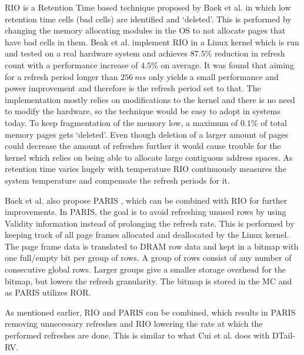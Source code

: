 RIO is a Retention Time based technique proposed by Baek et al. \cite{rioparis} in which low retention time cells (bad cells) are identified and `deleted'. This is performed by changing the memory allocating modules in the OS to not allocate pages that have bad cells in them. Beak et al. implement RIO in a Linux kernel which is run and tested on a real hardware system and achieves $87.5\%$ reduction in refresh count with a performance increase of $4.5\%$ on average. It was found that aiming for a refresh period longer than $256~ms$ only yields a small performance and power improvement and therefore is the refresh period set to that. The implementation mostly relies on modifications to the kernel and there is no need to modify the hardware, so the technique would be easy to adopt in systems today. To keep fragmentation of the memory low, a maximum of $0.1\%$ of total memory pages gets `deleted'. Even though deletion of a larger amount of pages could decrease the amount of refreshes further it would cause trouble for the kernel which relies on being able to allocate large contiguous address spaces. As retention time varies hugely with temperature RIO continuously measures the system temperature and compensate the refresh periods for it. 

Baek et al. also propose PARIS \cite{rioparis}, which can be combined with RIO for further improvements. In PARIS, the goal is to avoid refreshing unused rows by using Validity information instead of prolonging the refresh rate. This is performed by keeping track of all page frames allocated and deallocated by the Linux kernel. The page frame data is translated to DRAM row data and kept in a bitmap with one full/empty bit per group of rows. A group of rows consist of any number of consecutive global rows. Larger groups give a smaller storage overhead for the bitmap, but lowers the refresh granularity. The bitmap is stored in the MC and as PARIS utilizes ROR. 

As mentioned earlier, RIO and PARIS can be combined, which results in PARIS removing unnecessary refreshes and RIO lowering the rate at which the performed refreshes are done. This is similar to what Cui et al. does with DTail-RV. 
